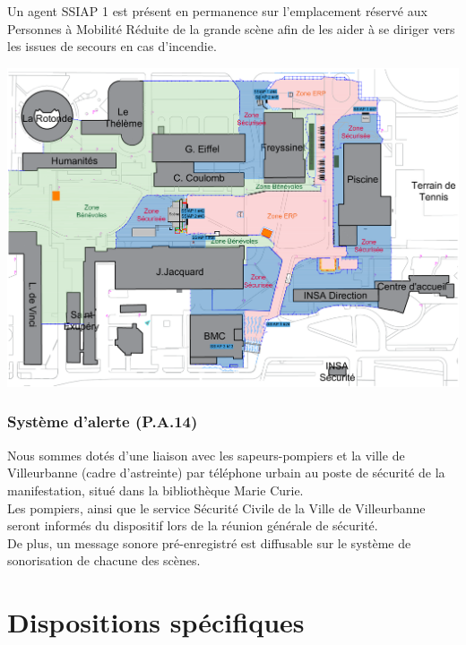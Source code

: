 \documentclass[hidelinks, paper=a4, fontsize=13pt]{report}
\begin{document}
Un agent SSIAP 1 est présent en permanence sur l’emplacement réservé aux Personnes à Mobilité Réduite de la grande scène afin de les aider à se diriger vers les issues de secours en cas d’incendie. 
\begin{center}
	\includegraphics[width=.8\textwidth,keepaspectratio]{Exports/Plan_24h_44eme-SSIAP}
\end{center}

\subsubsection{Système d'alerte  (P.A.14)}
\label{systemeAlerteIncendie}

Nous sommes dotés d’une liaison avec les sapeurs-pompiers et la ville de Villeurbanne (cadre d’astreinte) par téléphone urbain au poste de sécurité de la manifestation, situé dans la bibliothèque Marie Curie. \\

Les pompiers, ainsi que le service Sécurité Civile de la Ville de Villeurbanne seront informés du dispositif lors de la réunion générale de sécurité. \\

De plus, un message sonore pré-enregistré est diffusable sur le système de sonorisation de chacune des scènes.

\section{Dispositions spécifiques}
\end{document}
